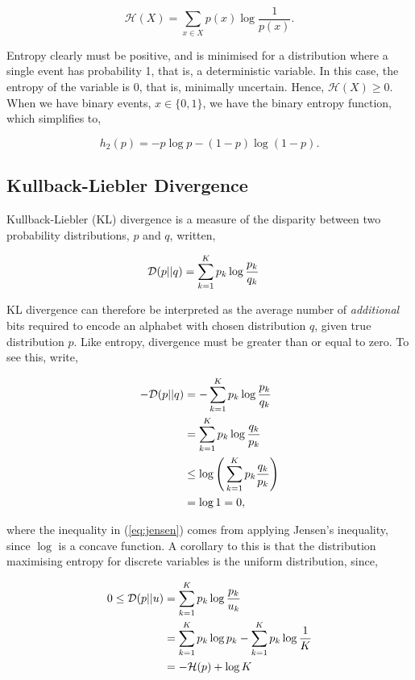 \documentclass[11pt]{amsart}
\begin{document}
$$\mathcal{H}(X) = \sum_{x \in X}p(x)\log\frac{1}{p(x)}.$$

Entropy clearly must be positive, and is minimised for a distribution where a single event has probability 1, that is, a deterministic variable. In this case, the entropy of the variable is 0, that is, minimally uncertain. Hence, $\mathcal{H}(X) \geq 0$. When we have binary events, $x \in \{0, 1\}$, we have the binary entropy function, which simplifies to,

$$h_2(p) = -p\log p - (1-p)\log (1 - p).$$

\subsection{Kullback-Liebler Divergence}

Kullback-Liebler (KL) divergence is a measure of the disparity between two probability distributions, $p$ and $q$, written,

\begin{align}
\mathcal{D}(p || q) &= \sum_{k=1}^K p_k \log\frac{p_k}{q_k} \notag
\end{align}

KL divergence can therefore be interpreted as the average number of \emph{additional} bits required to encode an alphabet with chosen distribution $q$, given true distribution $p$. Like entropy, divergence must be greater than or equal to zero. To see this, write,

\begin{align}
-\mathcal{D}(p || q) &= -\sum_{k=1}^K p_k \log\frac{p_k}{q_k} \notag \\
&= \sum_{k=1}^K p_k \log\frac{q_k}{p_k} \notag \\
&\leq \log\Bigg(\sum_{k=1}^K p_k\frac{q_k}{p_k}\Bigg) \label{eq:jensen} \\
&= \log 1 = 0, \notag
\end{align}

where the inequality in (\ref{eq:jensen}) comes from applying Jensen's inequality, since $\log$ is a concave function. A corollary to this is that the distribution maximising entropy for discrete variables is the uniform distribution, since,

\begin{align}
0 \leq \mathcal{D}(p || u) &= \sum_{k=1}^K p_k \log\frac{p_k}{u_k} \notag \\
&= \sum_{k=1}^K p_k \log{p_k} - \sum_{k=1}^K p_k \log \frac{1}{K} \notag \\
&= -\mathcal{H}(p) + \log K \notag
\end{align}
\end{document}
